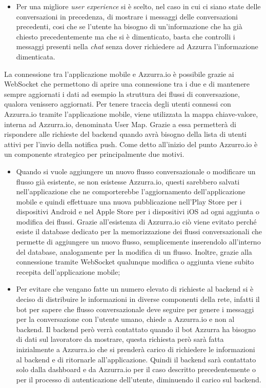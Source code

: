 \begin{trivlist}
\begin{itemize}
		\item Per una migliore \emph{user experience} si è scelto, nel caso in cui ci siano state delle conversazioni in precedenza, di mostrare i messaggi delle conversazioni precedenti, cosi che se l'utente ha bisogno di un’informazione che ha già chiesto precedentemente ma che si è dimenticato, basta che controlli i messaggi presenti nella \emph{chat} senza dover richiedere ad Azzurra l'informazione dimenticata.
	\end{itemize}
	La connessione tra l'applicazione mobile e Azzurra.io è possibile grazie ai \gls{WebSocket}\ap{[g]} che permettono di aprire una connessione tra i due e di mantenere sempre aggiornati i dati ad esempio la struttura dei flussi di conversazione, qualora venissero aggiornati. Per tenere traccia degli utenti connessi con Azzurra.io tramite l'applicazione mobile, viene utilizzata la mappa chiave-valore, interna ad Azzurra.io, denominata User Map. Grazie a essa permetterà di rispondere alle richieste del backend quando avrà bisogno della lista di utenti attivi per l'invio della notifica push. Come detto all'inizio del punto Azzurro.io è un componente strategico per principalmente due motivi.
	\begin{itemize}
		\item Quando si vuole aggiungere un nuovo flusso conversazionale o modificare un flusso già esistente, se non esistesse Azzurra.io, questi sarebbero salvati nell'applicazione che ne comporterebbe l'aggiornamento dell'applicazione mobile e quindi effettuare una nuova pubblicazione nell'Play Store per i dispositivi Android e nel Apple Store per i dispositivi iOS ad ogni aggiunta o modifica dei flussi. Grazie all'esistenza di Azzurra.io ciò viene evitato perché esiste il database dedicato per la memorizzazione dei flussi conversazionali che permette di aggiungere un nuovo flusso, semplicemente inserendolo all'interno del database, analogamente per la modifica di un flusso. Inoltre, grazie alla connessione tramite \gls{WebSocket}\ap{[g]} qualunque modifica o aggiunta viene subito recepita dell'applicazione mobile;
		\item Per evitare che vengano fatte un numero elevato di richieste al backend si è deciso di distribuire le informazioni in diverse componenti della rete, infatti il \gls{bot}\ap{[g]} per sapere che flusso conversazionale deve seguire per genere i messaggi per la conversazione con l'utente umano, chiede a Azzurra.io e non al backend. Il backend però verrà contattato quando il \gls{bot}\ap{[g]} Azzurra ha bisogno di dati sul lavoratore da mostrare, questa richiesta però sarà fatta inizialmente a Azzurra.io che si prenderà carico di richiedere le informazioni al backend e di ritornarle all'applicazione. Quindi il backend sarà contattato solo dalla dashboard e da Azzurra.io per il caso descritto precedentemente o per il processo di autenticazione dell'utente, diminuendo il carico sul backend.
	\end{itemize}
	

\end{trivlist}
